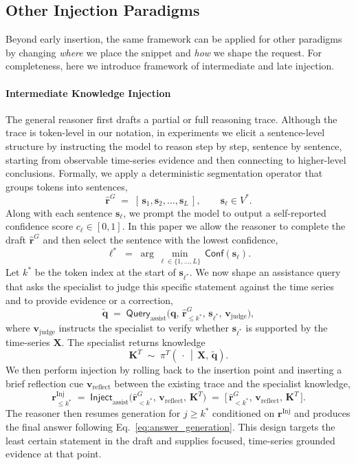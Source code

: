 \documentclass[twoside]{article}
\begin{document}
\subsection{Other Injection Paradigms}
Beyond early insertion, the same framework can be applied for other paradigms by changing \emph{where} we place the snippet and \emph{how} we shape the request. For completeness, here we introduce framework of intermediate and late injection.


\paragraph{Intermediate Knowledge Injection}
The general reasoner first drafts a partial or full reasoning trace. Although the trace is token-level in our notation, in experiments we elicit a sentence-level structure by instructing the model to reason step by step, sentence by sentence, starting from observable time-series evidence and then connecting to higher-level conclusions. Formally, we apply a deterministic segmentation operator that groups tokens into sentences,
\[
\hat{\mathbf{r}}^{G} \;=\; [\, \mathbf{s}_1, \mathbf{s}_2, \ldots, \mathbf{s}_L \,], \qquad \mathbf{s}_\ell \in V^{*}.
\]
Along with each sentence \(\mathbf{s}_\ell\), we prompt the model to output a self-reported confidence score \(c_\ell \in [0,1]\). In this paper we allow the reasoner to complete the draft \(\hat{\mathbf{r}}^{G}\) and then select the sentence with the lowest confidence,
\[
\ell^{*} \;=\; \arg\min_{\ell \in \{1,\ldots,L\}} \, \mathsf{Conf}(\mathbf{s}_\ell).
\]
Let \(k^{*}\) be the token index at the start of \(\mathbf{s}_{\ell^{*}}\). We now shape an assistance query that asks the specialist to judge this specific statement against the time series and to provide evidence or a correction,
\[
\tilde{\mathbf{q}} \;=\; \mathsf{Query}_{\mathrm{assist}}\!\big(\mathbf{q},\, \hat{\mathbf{r}}^{G}_{\le k^{*}},\, \mathbf{s}_{\ell^{*}},\, \mathbf{v}_{\mathrm{judge}}\big),
\]
where \(\mathbf{v}_{\mathrm{judge}}\) instructs the specialist to verify whether \(\mathbf{s}_{\ell^{*}}\) is supported by the time-series \(\mathbf{X}\). The specialist returns knowledge
\[
\mathbf{K}^{T} \;\sim\; \pi^{T}\!\left(\,\cdot \,\middle|\, \mathbf{X},\, \tilde{\mathbf{q}} \right).
\]
We then perform injection by rolling back to the insertion point and inserting a brief reflection cue \(\mathbf{v}_{\mathrm{reflect}}\) between the existing trace and the specialist knowledge,
\[
\mathbf{r}^{\mathrm{Inj}}_{\le k^{*}} 
\;=\; \mathsf{Inject}_{\mathrm{assist}}\!\big(\hat{\mathbf{r}}^{G}_{< k^{*}},\, \mathbf{v}_{\mathrm{reflect}},\, \mathbf{K}^{T}\big)
\;=\; \big[\, \hat{\mathbf{r}}^{G}_{< k^{*}},\, \mathbf{v}_{\mathrm{reflect}},\, \mathbf{K}^{T} \,\big].
\]
The reasoner then resumes generation for \(j \ge k^{*}\) conditioned on \(\mathbf{r}^{\mathrm{Inj}}\) and produces the final answer following Eq.~\eqref{eq:answer_generation}. This design targets the least certain statement in the draft and supplies focused, time-series grounded evidence at that point.
\end{document}
